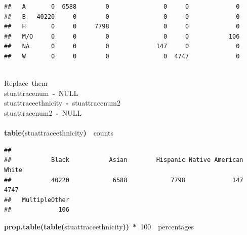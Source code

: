\documentclass[12pt]{article}
\makeatletter
\newcommand{\hlnumber}[1]{\textcolor[rgb]{0,0,0}{#1}}%
\newcommand{\hlfunctioncall}[1]{\textcolor[rgb]{0.501960784313725,0,0.329411764705882}{\textbf{#1}}}%
\newcommand{\hlkeyword}[1]{\textcolor[rgb]{0,0,0}{\textbf{#1}}}%
\newcommand{\hlcomment}[1]{\textcolor[rgb]{0.180392156862745,0.6,0.341176470588235}{#1}}%
\newcommand{\hlassignement}[1]{\textcolor[rgb]{0,0,0}{\textbf{#1}}}%
\newcommand{\hlsymbol}[1]{\textcolor[rgb]{0,0,0}{#1}}%
\newcommand{\hlstd}[1]{\textcolor[rgb]{0,0,0}{#1}}%
\newenvironment{kframe}{%
 \def\FrameCommand##1{\hskip\@totalleftmargin \hskip-\fboxsep
 \colorbox{shadecolor}{##1}\hskip-\fboxsep
     \hskip-\linewidth \hskip-\@totalleftmargin \hskip\columnwidth}%
 \MakeFramed {\advance\hsize-\width
   \@totalleftmargin\z@ \linewidth\hsize
   \@setminipage}}%
 {\par\unskip\endMakeFramed}
\newenvironment{knitrout}{}{} %
\makeatother
\begin{document}
\begin{knitrout}
\begin{kframe}
\begin{verbatim}
##   A       0  6588        0               0     0             0
##   B   40220     0        0               0     0             0
##   H       0     0     7798               0     0             0
##   M/O     0     0        0               0     0           106
##   NA      0     0        0             147     0             0
##   W       0     0        0               0  4747             0
\end{verbatim}
\begin{flushleft}
\ttfamily\noindent
\hspace*{\fill}\\
\hlstd{}\hlcomment{\usebox{\hlnormalsizeboxhash}{\ }Replace{\ }them}\hspace*{\fill}\\
\hlstd{}\hlsymbol{stuatt}\hlkeyword{\usebox{\hlnormalsizeboxdollar}}\hlsymbol{race\usebox{\hlnormalsizeboxunderscore}num}{\ }\hlassignement{\usebox{\hlnormalsizeboxlessthan}-}{\ }NULL\hspace*{\fill}\\
\hlstd{}\hlsymbol{stuatt}\hlkeyword{\usebox{\hlnormalsizeboxdollar}}\hlsymbol{race\usebox{\hlnormalsizeboxunderscore}ethnicity}{\ }\hlassignement{\usebox{\hlnormalsizeboxlessthan}-}{\ }\hlsymbol{stuatt}\hlkeyword{\usebox{\hlnormalsizeboxdollar}}\hlsymbol{race\usebox{\hlnormalsizeboxunderscore}num2}\hspace*{\fill}\\
\hlstd{}\hlsymbol{stuatt}\hlkeyword{\usebox{\hlnormalsizeboxdollar}}\hlsymbol{race\usebox{\hlnormalsizeboxunderscore}num2}{\ }\hlassignement{\usebox{\hlnormalsizeboxlessthan}-}{\ }NULL\hspace*{\fill}\\
\hlstd{}\hspace*{\fill}\\
\hlstd{}\hlfunctioncall{table}\hlkeyword{(}\hlsymbol{stuatt}\hlkeyword{\usebox{\hlnormalsizeboxdollar}}\hlsymbol{race\usebox{\hlnormalsizeboxunderscore}ethnicity}\hlkeyword{)}{\ }{\ }\hlcomment{\usebox{\hlnormalsizeboxhash}{\ }counts}\mbox{}
\normalfont
\end{flushleft}
\begin{verbatim}
## 
##           Black           Asian        Hispanic Native American           White 
##           40220            6588            7798             147            4747 
##   MultipleOther 
##             106 
\end{verbatim}
\begin{flushleft}
\ttfamily\noindent
\hlfunctioncall{prop.table}\hlkeyword{(}\hlfunctioncall{table}\hlkeyword{(}\hlsymbol{stuatt}\hlkeyword{\usebox{\hlnormalsizeboxdollar}}\hlsymbol{race\usebox{\hlnormalsizeboxunderscore}ethnicity}\hlkeyword{)}\hlkeyword{)}{\ }\hlkeyword{*}{\ }\hlnumber{100}{\ }{\ }\hlcomment{\usebox{\hlnormalsizeboxhash}percentages}\mbox{}

\end{flushleft}
\end{kframe}
\end{knitrout}
\end{document}
